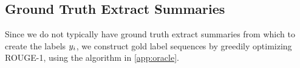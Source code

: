\subsection{Ground Truth Extract Summaries}
Since we do not typically have ground truth extract summaries from which to
create the labels $\slabel_i$, we construct gold label sequences 
by greedily optimizing ROUGE-1, using the algorithm in \autoref{app:oracle}.

